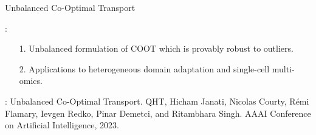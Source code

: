\documentclass{beamer}
\begin{document}
\begin{frame}{Unbalanced Co-Optimal Transport}
  \scriptsize


  \vspace{5cm}
  {}:
  \begin{enumerate}
    \setlength\itemindent{10pt}
    \item[1.] Unbalanced formulation of COOT which is provably robust to outliers.
    \item[2.] Applications to heterogeneous domain adaptation and single-cell multi-omics.
  \end{enumerate}

  \vspace{0.3cm}
  {}: Unbalanced Co-Optimal Transport.
  QHT, Hicham Janati, Nicolas Courty, Rémi Flamary, Ievgen Redko,
  Pinar Demetci, and Ritambhara Singh.
  AAAI Conference on Artificial Intelligence, 2023.

\end{frame}
\end{document}
